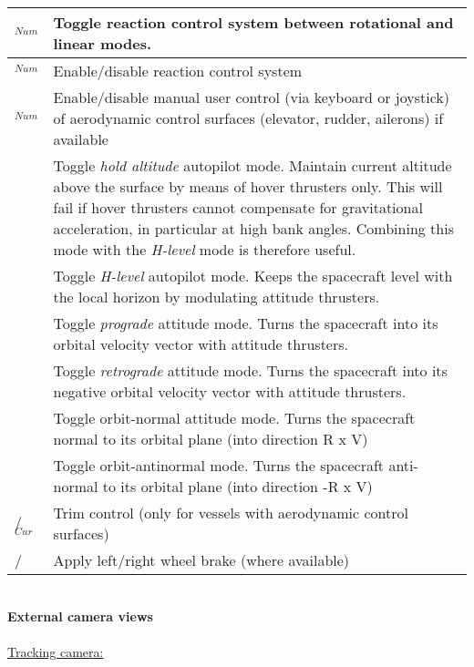 \documentclass[Orbiter User Manual.tex]{subfiles}
\begin{document}
	\begin{longtable}{ |p{}|p{}| }
	\hline\rule{0pt}{2ex}
	\keystroke{/}$_{Num}$ & Toggle reaction control system between rotational and linear modes.\\
	\hline\rule{0pt}{2ex}
	\Ctrl\keystroke{/}$_{Num}$ & Enable/disable reaction control system\\
	\hline\rule{0pt}{2ex}
	\Alt\keystroke{/}$_{Num}$ & Enable/disable manual user control (via keyboard or joystick) of aerodynamic control surfaces (elevator, rudder, ailerons) if available\\
	\hline\rule{0pt}{2ex}
	\keystroke{A} & Toggle \textit{hold altitude} autopilot mode. Maintain current altitude above the surface by means of hover thrusters only. This will fail if hover thrusters cannot compensate for gravitational acceleration, in particular at high bank angles. Combining this mode with the \textit{H-level} mode is therefore useful.\\
	\hline\rule{0pt}{2ex}
	\keystroke{L} & Toggle \textit{H-level} autopilot mode. Keeps the spacecraft level with the local horizon by modulating attitude thrusters.\\
	\hline\rule{0pt}{2ex}
	\keystroke{[} & Toggle \textit{prograde} attitude mode. Turns the spacecraft into its orbital velocity vector with attitude thrusters.\\
	\hline\rule{0pt}{2ex}
	\keystroke{]} & Toggle \textit{retrograde} attitude mode. Turns the spacecraft into its negative orbital velocity vector with attitude thrusters.\\
	\hline\rule{0pt}{2ex}
	\keystroke{;} & Toggle orbit-normal attitude mode. Turns the spacecraft normal to its orbital plane (into direction R x V)\\
	\hline\rule{0pt}{2ex}
	\keystroke{'} & Toggle orbit-antinormal mode. Turns the spacecraft anti-normal to its orbital plane (into direction -R x V)\\
	\hline\rule{0pt}{2ex}
	\keystroke{Ins}/\keystroke{Del}$_{Cur}$ & Trim control (only for vessels with aerodynamic control surfaces)\\
	\hline\rule{0pt}{2ex}
	\keystroke{,}/\keystroke{.} & Apply left/right wheel brake (where available)\\
	\hline
	\end{longtable}

\noindent
\\
\textbf{External camera views}\\
\\
\underline{Tracking camera:}
\end{document}
